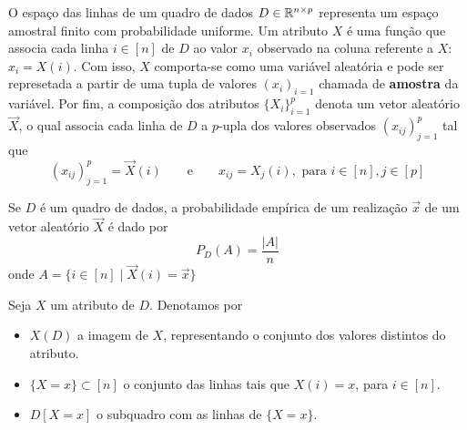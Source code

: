 O espaço das linhas de um quadro de dados $D \in \mathbb{R}^{n \times p}$ representa um espaço
amostral finito com probabilidade uniforme.
Um atributo $X$ é uma função que associa cada linha $i \in [n]$ de $D$ ao valor $x_i$
observado na coluna referente a $X$: $x_i = X(i)$.
Com isso, $X$ comporta-se como uma variável aleatória e pode ser represetada a partir de
uma tupla de valores $(x_i)_{i=1}$ chamada de \textbf{amostra} da variável.
Por fim, a composição dos atributos $\{X_i\}_{i=1}^p$ denota um vetor aleatório $\vec X$,
o qual associa cada linha de $D$ a $p$-upla dos valores observados $(x_{ij})_{j=1}^p$
tal que
\[
(x_{ij})_{j=1}^p = \vec X(i) \qquad \text{e} \qquad x_{ij} = X_j(i), \text{ para }
i \in [n], j \in [p]
\]

\begin{def:probabilidade empirica}
Se $D$ é um quadro de dados, a probabilidade empírica de um realização $\vec x$ de um
vetor aleatório $\vec X$ é dado por
\[
    P_D(A) = \frac{\lvert A \rvert}{n}
\]
onde $A = \{i \in [n] \mid \vec X(i) = \vec x\}$
\end{def:probabilidade empirica}

Seja $X$ um atributo de $D$.
Denotamos por
\begin{itemize}
\item $X(D)$ a imagem de $X$, representando o conjunto dos valores distintos do atributo.
\item $\{X = x\} \subset [n]$ o conjunto das linhas tais que $X(i) = x$, para $i \in [n]$.
\item $D[X = x]$ o subquadro com as linhas de $\{X = x\}$.
\end{itemize}

